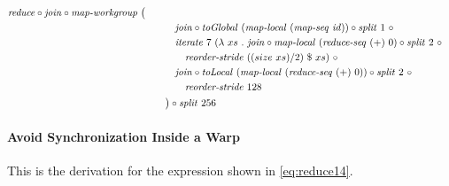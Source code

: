 \begin{align*}
\begin{aligned}
      \reduce \circ \join \circ \mapWorkgroup\ \big(\\
    &\qquad\quad\join \circ \toGlobal\ (\mapLocal\ (\mapSeq\ \id)) \circ \splitN\ 1\ \circ\\
    &\qquad\quad\iterateN\ 7\ (\lambda\ xs\ .\ \join \circ \mapLocal\ (\reduceSeq\ (+)\ 0) \circ \splitN\ 2\ \circ\\
    &\qquad\qquad \reorderStride\ ((size\ xs)/2)\ \$\ xs )\ \circ\\
    &\qquad\quad\join \circ \toLocal\ (\mapLocal\ (\reduceSeq\ (+)\ 0)) \circ \splitN\ 2\ \circ\\
    &\qquad\qquad\reorderStride\ 128\\
    &\qquad\big) \circ \splitN\ 256
  \end{aligned}
%  
\end{align*}

\normalsize




\paragraph{Avoid Synchronization Inside a Warp}
This is the derivation for the expression shown in \autoref{eq:reduce14}.

\small

